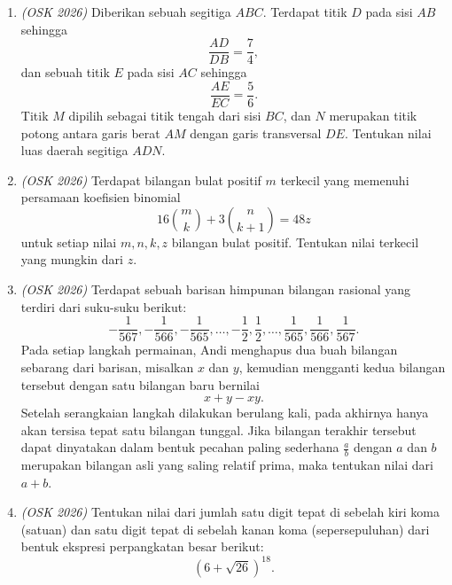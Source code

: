 \documentclass[11pt]{scrartcl}
\begin{document}
\begin{enumerate}
\item \textit{(OSK 2026)} Diberikan sebuah segitiga $ABC$. Terdapat titik $D$ pada sisi $AB$ sehingga
\[
\frac{AD}{DB}=\frac{7}{4},
\]
dan sebuah titik $E$ pada sisi $AC$ sehingga
\[
\frac{AE}{EC}=\frac{5}{6}.
\]
Titik $M$ dipilih sebagai titik tengah dari sisi $BC$, dan $N$ merupakan titik potong antara garis berat $AM$ dengan garis transversal $DE$. Tentukan nilai luas daerah segitiga $ADN$.

\item \textit{(OSK 2026)} Terdapat bilangan bulat positif $m$ terkecil yang memenuhi persamaan koefisien binomial
\[
16\binom{m}{k}+3\binom{n}{k+1}=48z
\]
untuk setiap nilai $m,n,k,z$ bilangan bulat positif. Tentukan nilai terkecil yang mungkin dari $z$.

\item \textit{(OSK 2026)} Terdapat sebuah barisan himpunan bilangan rasional yang terdiri dari suku-suku berikut:
\[
-\frac1{567},-\frac1{566},-\frac1{565},\ldots,-\frac12,\frac12,\ldots,\frac1{565},\frac1{566},\frac1{567}.
\]
Pada setiap langkah permainan, Andi menghapus dua buah bilangan sebarang dari barisan, misalkan $x$ dan $y$, kemudian mengganti kedua bilangan tersebut dengan satu bilangan baru bernilai
\[
x+y-xy.
\]
Setelah serangkaian langkah dilakukan berulang kali, pada akhirnya hanya akan tersisa tepat satu bilangan tunggal. Jika bilangan terakhir tersebut dapat dinyatakan dalam bentuk pecahan paling sederhana $\frac{a}{b}$ dengan $a$ dan $b$ merupakan bilangan asli yang saling relatif prima, maka tentukan nilai dari $a+b$.

\item \textit{(OSK 2026)} Tentukan nilai dari jumlah satu digit tepat di sebelah kiri koma (satuan) dan satu digit tepat di sebelah kanan koma (sepersepuluhan) dari bentuk ekspresi perpangkatan besar berikut:
\[
(6+\sqrt{26})^{18}.
\]
\end{enumerate}
\end{document}
